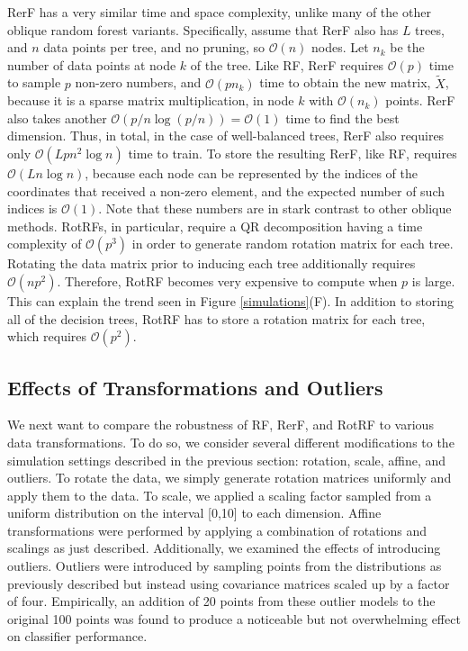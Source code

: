 \documentclass{article}
\providecommand{\mc}[1]{\mathcal{#1}}
\providecommand{\mt}[1]{\widetilde{#1}}
\begin{document}
RerF has a very similar time and space complexity, unlike many of the other oblique random forest variants.  Specifically, assume that RerF also has $L$ trees, and $n$ data points per tree, and no pruning, so $\mc O(n)$ nodes. Let $n_k$ be the number of data points at node $k$ of the tree. Like RF, RerF requires $\mc{O}(p)$ time to sample $p$ non-zero numbers, and $\mc{O}(pn_k)$ time to obtain the new matrix, $\mt{X}$, because it is a sparse matrix multiplication, in node $k$ with $\mc O(n_k)$ points. RerF also takes another $\mc{O}(p/n\log(p/n))=\mc O(1)$ time to find the best dimension. Thus, in total, in the case of well-balanced trees, RerF also requires only $\mc{O}(Lpn^2\log n)$ time to train.  To store the resulting RerF, like RF, requires $\mc{O}(L n\log n )$, because each node can be represented by the indices of the coordinates that received a non-zero element, and the expected number of such indices is $\mc O(1)$. Note that these numbers are in stark contrast to other oblique methods. RotRFs, in particular, require a QR decomposition having a time complexity of $\mc O(p^3)$ in order to generate random rotation matrix for each tree. Rotating the data matrix prior to inducing each tree additionally requires $\mc O(np^2)$. Therefore, RotRF becomes very expensive to compute when $p$ is large. This can explain the trend seen in Figure \ref{simulations}(F). In addition to storing all of the decision trees, RotRF has to store a rotation matrix for each tree, which requires $\mc O(p^2)$.

\subsection{Effects of Transformations and Outliers}
\label{section: trans}

We next want to compare the robustness of RF, RerF, and RotRF to various data transformations. To do so, we consider several different modifications to the simulation settings described in the previous section: rotation, scale, affine, and outliers.  To rotate the data, we simply generate rotation matrices uniformly and apply them to the data. To scale, we applied a scaling factor sampled from a uniform distribution on the interval [0,10] to each dimension. Affine transformations were performed by applying a combination of rotations and scalings as just described. Additionally, we examined the effects of introducing outliers. Outliers were introduced by sampling points from the distributions as previously described but instead using covariance matrices scaled up by a factor of four. Empirically, an addition of 20 points from these outlier models to the original 100 points was found to produce a noticeable but not overwhelming effect on classifier performance.
\end{document}
